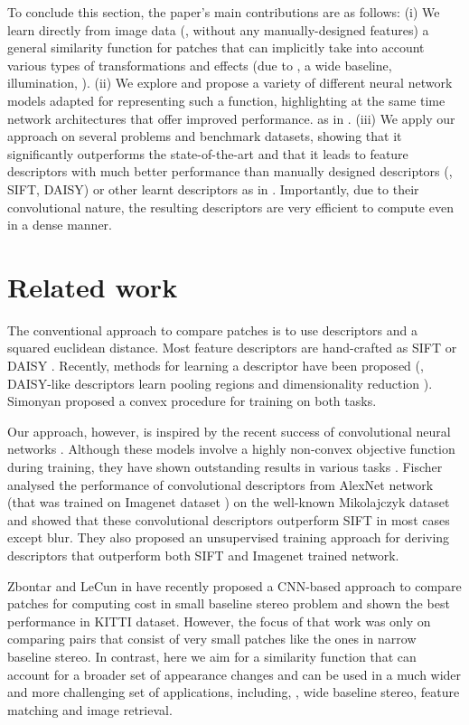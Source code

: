 \documentclass[10pt,twocolumn,letterpaper]{article}
\begin{document}
To conclude this section, the paper's main contributions  are as follows:
(i) We learn directly from image data (\ie, without any manually-designed features) a  general similarity function  for patches that can implicitly take into account various types of transformations and effects (due to \eg, a wide baseline, illumination, \etc). (ii) We  explore and propose a variety of different neural network models adapted for  representing such a function, highlighting  at the same time network architectures 
that  offer improved  performance. 
%
  as in \cite{Simonyan14}.
%
%
(iii) We apply our approach on several problems and benchmark datasets, showing that it significantly outperforms the state-of-the-art and that it leads to feature descriptors  with much better performance than manually designed descriptors  (\eg, SIFT, DAISY) or     other learnt descriptors
  as in \cite{Simonyan14}. Importantly, due to their convolutional nature, the resulting descriptors are very efficient to compute even in a dense manner.
  
  
\section{Related work}

The conventional approach to compare patches is to use descriptors and a squared euclidean distance. Most feature descriptors
are hand-crafted as SIFT \cite{LoweSift} or DAISY \cite{Tola08}. Recently, methods for learning a descriptor have been proposed \cite{Trzcinski12} (\eg, DAISY-like descriptors learn pooling regions and dimensionality reduction \cite{BHW10}). Simonyan \etal 
\cite{Simonyan14} proposed a convex procedure for training on both tasks.

Our approach, however, is inspired by the recent success of convolutional neural networks \cite{Razavian, deepface, Szegedy, depth_map}. Although these models   involve 
a highly non-convex  objective function during training, they have shown outstanding results in various tasks \cite{Razavian}. Fischer \etal \cite{comparison} analysed the performance of convolutional descriptors from AlexNet 
network (that was trained on Imagenet dataset \cite{kriz2012}) on the well-known Mikolajczyk dataset \cite{MS05} 
and showed that these convolutional descriptors outperform SIFT in most cases except blur. They also 
proposed an unsupervised training approach for deriving descriptors that outperform both SIFT and Imagenet trained network.

Zbontar and LeCun in \cite{Zbontar} have recently proposed a CNN-based approach to compare patches 
for computing cost in small baseline stereo problem and shown the best performance in KITTI dataset. 
However, the focus of that work was   only on comparing pairs that consist of very small patches like the ones in narrow baseline stereo. In contrast, here we aim for a   similarity function that can account for a broader set of appearance changes  and can be used in a much wider and more challenging set of applications, including, \eg, wide baseline stereo, 
feature matching and image retrieval.
\end{document}
